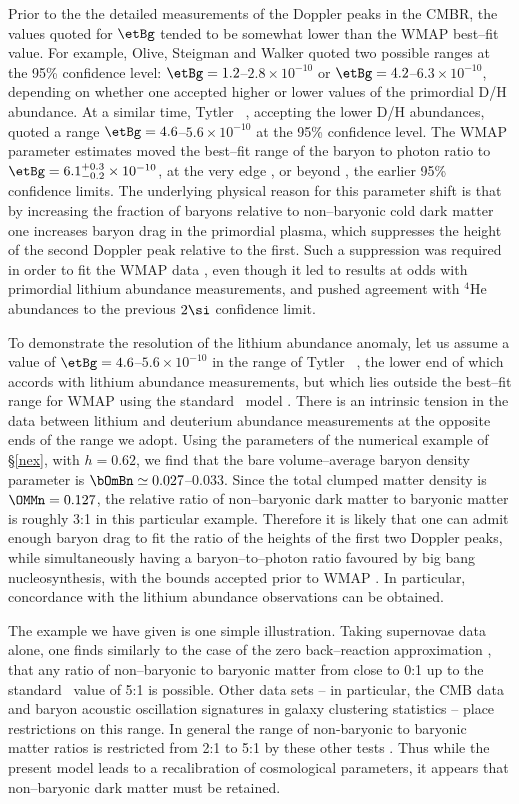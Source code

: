 \documentclass[12pt]{iopart}
\begin{document}
Prior to the
the detailed measurements of the Doppler peaks in the CMBR, the values
quoted for $\etBg$ tended to be somewhat lower than the WMAP best--fit value.
For example, Olive, Steigman and Walker \cite{bbn1} quoted two possible
ranges at the 95\% confidence level: $\etBg=1.2$--$2.8\times10^{-10}$ or
$\etBg=4.2$--$6.3\times10^{-10}$, depending on whether one accepted higher
or lower values of the primordial D/H abundance. At a similar time, Tytler
\etal\ \cite{bbn2}, accepting the lower D/H abundances, quoted a range
$\etBg=4.6$--$5.6\times10^{-10}$ at the 95\% confidence level.
The WMAP parameter estimates moved the best--fit
range of the baryon to photon ratio to $\etBg=6.1^{+0.3}_{-0.2}\times10^{-10}
$, at the very edge \cite{bbn1}, or beyond \cite{bbn2}, the earlier
95\% confidence limits. The underlying physical reason for this parameter
shift is that by increasing the fraction of baryons relative to
non--baryonic cold dark matter one increases baryon drag in the
primordial plasma, which
suppresses the height of the second Doppler peak relative to the first.
Such a suppression was required in order to fit the WMAP data
\cite{wmap}, even though it led to results at odds with primordial
lithium abundance measurements, and pushed agreement with $^4$He abundances
to the previous $2\si$ confidence limit.

To demonstrate the resolution of the lithium abundance anomaly, let us
assume a value of $\etBg=4.6$--$5.6\times10^{-10}$ in the range of
Tytler \etal\ \cite{bbn2}, the lower end of which accords with lithium
abundance measurements, but which lies outside the best--fit range for WMAP
using the standard \LCDM\ model \cite{bbn3}. There is an intrinsic tension
in the data between lithium and deuterium abundance measurements \cite{bbn4}
at the opposite ends of the range we adopt. Using the parameters of the
numerical example of \S\ref{nex}, with $h=0.62$, we find that the
bare volume--average baryon density parameter is
$\bOmBn\simeq0.027$--$0.033$.
Since the total clumped matter density is $\OMMn=0.127$,
the relative ratio of non--baryonic dark matter to baryonic
matter is roughly 3:1 in this particular example. Therefore it
is likely that one can admit enough baryon drag to fit the ratio of
the heights of the first two Doppler peaks, while simultaneously
having a baryon--to--photon ratio favoured by big bang nucleosynthesis,
with the bounds accepted prior to WMAP \cite{bbn1,bbn2}. In particular,
concordance with the lithium abundance observations can be obtained.

The example we have given is one simple illustration. Taking supernovae
data alone, one finds similarly to the case of the zero back--reaction
approximation \cite{paper1}, that any ratio of non--baryonic to baryonic
matter from close to 0:1 up to the standard \LCDM\ value of 5:1 is possible.
Other data sets -- in particular, the CMB data and baryon acoustic
oscillation signatures in galaxy clustering statistics -- place restrictions
on this range. In general the range of non-baryonic to baryonic matter
ratios is restricted from 2:1 to 5:1 by these other tests \cite{paper2}. Thus
while the present model leads to a recalibration of cosmological parameters,
it appears that non--baryonic dark matter must be retained.
\end{document}

